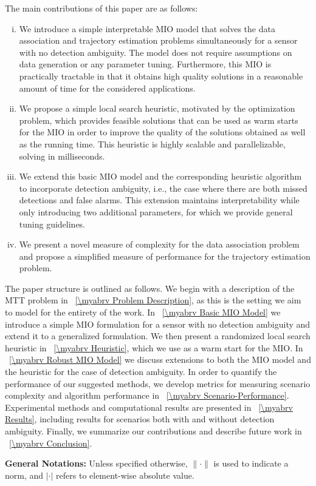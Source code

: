 The main contributions of this paper are as follows: 
\begin{enumerate}[(i)]
\item We introduce a simple interpretable MIO model that solves the data association and trajectory estimation problems simultaneously for a sensor with no detection ambiguity. The model does not require assumptions on data generation or any parameter tuning. Furthermore, this MIO is practically tractable in that it obtains high quality solutions in a reasonable amount of time for the considered applications.
\item We propose a simple local search heuristic, motivated by the optimization problem, which provides feasible solutions that can be used as warm starts for the MIO in order to improve the quality of the solutions obtained as well as the running time. This heuristic is highly scalable and parallelizable, solving in milliseconds.
\item We extend this basic MIO model and the corresponding heuristic algorithm to incorporate detection ambiguity, i.e., the case where there are both missed detections and false alarms. This extension maintains interpretability while only introducing two additional parameters, for which we provide general tuning guidelines. 
\item  We present a novel measure of complexity for the data association problem and propose a simplified measure of performance for the trajectory estimation problem. 
\end{enumerate}

The paper structure is outlined as follows. We begin with a description of the MTT problem in \mysection~\ref{\myabrv Problem Description}, as this is the setting we aim to model for the entirety of the work. In \mysection~\ref{\myabrv Basic MIO Model} we introduce a simple MIO formulation for a sensor with no detection ambiguity and extend it to a generalized formulation. We then present a randomized local search heuristic in \mysection~\ref{\myabrv Heuristic}, which we use as a warm start for the MIO. In \mysection~\ref{\myabrv Robust MIO Model} we discuss extensions to both the MIO model and the heuristic for the case of detection ambiguity. In order to quantify the performance of our suggested methods, we develop metrics for measuring scenario complexity and algorithm performance in \mysection~\ref{\myabrv Scenario-Performance}.  Experimental methods and computational results are presented in \mysection~\ref{\myabrv Results}, including results for scenarios both with and without detection ambiguity. Finally, we summarize our contributions and describe future work in \mysection~\ref{\myabrv Conclusion}.

{\bf General Notations:}
Unless specified otherwise, $\|\cdot\|$ is used to indicate a norm, and $|\cdot|$ refers to element-wise absolute value.